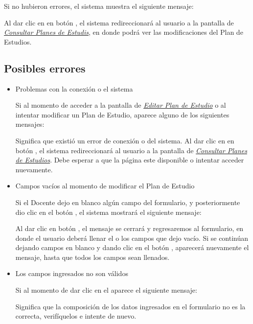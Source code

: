 Si no hubieron errores, el sistema muestra el siguiente mensaje:

Al dar clic en en botón  , el sistema redireccionará al usuario a la pantalla de \hyperlink{consultarPE}{\textit{Consultar Planes de Estudis}}, en donde podrá ver las modificaciones del Plan de Estudios.\\

\subsection{Posibles errores}

\begin{itemize}
	\item Problemas con la conexión o el sistema
	
	Si al momento de acceder a la pantalla de \hyperlink{editarPE}{\textit{Editar Plan de Estudio}} o al intentar modificar un Plan de Estudio, aparece alguno de los siguientes mensajes:
	
	
	Significa que existió un error de conexión o del sistema. Al dar clic en en botón  , el sistema redireccionará al usuario a la pantalla de \hyperlink{consultarPE}{\textit{Consultar Planes de Estudios}}. Debe esperar a que la página este disponible o intentar acceder nuevamente.
	
	\item Campos vacíos al momento de modificar el Plan de Estudio
	
	Si el Docente dejo en blanco algún campo del formulario, y posteriormente dio clic en el botón  , el sistema mostrará el siguiente mensaje:
	
	
	Al dar clic en botón  , el mensaje se cerrará y regresaremos al formulario, en donde el usuario deberá llenar el o los campos que dejo vacío. Si se continúan dejando campos en blanco y dando clic en el botón  , aparecerá nuevamente el mensaje, hasta que todos los campos sean llenados.
	
	\item Los campos ingresados no son válidos
	
	Si al momento de dar clic en el  aparece el siguiente mensaje:
	
	Significa que la composición de los datos ingresados en el formulario no es la correcta, verifíquelos e intente de nuevo.
	
\end{itemize}

